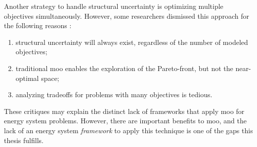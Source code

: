 Another strategy to handle structural uncertainty is optimizing multiple objectives 
simultaneously. However, some researchers dismissed this approach for the following 
reasons \cite{decarolis_using_2011}:
\begin{enumerate}
    \item structural uncertainty will always exist, regardless of the number of 
    modeled objectives;
    \item traditional \ac{moo} enables the exploration of the Pareto-front, but not 
    the near-optimal space;
    \item analyzing tradeoffs for problems with many objectives is tedious.
\end{enumerate}
These critiques may explain the distinct lack of frameworks that apply \ac{moo} for 
energy system problems. However, there are important benefits to \ac{moo}, and the
lack of an energy system \textit{framework} to apply this technique is one of the
gaps this thesis fulfills.



